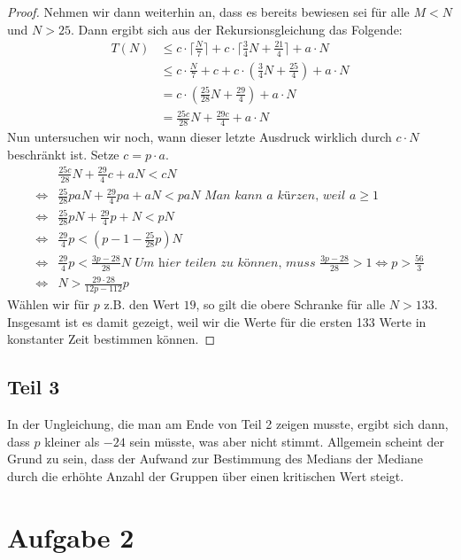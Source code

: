 \documentclass[10pt,a4paper]{article}
\begin{document}
\begin{proof}
  Nehmen wir dann weiterhin an, dass es bereits bewiesen sei für alle $M < N$ und $N > 25$.
  Dann ergibt sich aus der Rekursionsgleichung das Folgende:
  \begin{align*}
    T(N) & \le c \cdot \lceil \frac{N}{7} \rceil + c \cdot \lceil \frac{3}{4}N + \frac{21}{4} \rceil + a \cdot N\\
    & \le c \cdot \frac{N}{7} + c + c \cdot \left( \frac{3}{4}N + \frac{25}{4} \right) + a \cdot N\\
    & = c \cdot \left( \frac{25}{28}N + \frac{29}{4} \right) + a \cdot N\\
    & = \frac{25c}{28}N + \frac{29c}{4} + a \cdot N
  \end{align*}
  Nun untersuchen wir noch, wann dieser letzte Ausdruck wirklich durch $c \cdot N$ beschränkt ist.
  Setze $c = p \cdot a$.
  \begin{align*}
    & \frac{25c}{28}N + \frac{29}{4}c + aN < cN\\
    \Leftrightarrow & \frac{25}{28}paN + \frac{29}{4}pa + aN < paN \textit{ Man kann $a$ kürzen, weil $a \ge 1$}\\
    \Leftrightarrow & \frac{25}{28}pN + \frac{29}{4}p + N < pN\\
    \Leftrightarrow & \frac{29}{4}p < (p - 1 - \frac{25}{28}p)N\\
    \Leftrightarrow & \frac{29}{4}p < \frac{3p - 28}{28}N \textit{ Um hier teilen zu können, muss $\frac{3p - 28}{28} > 1 \Leftrightarrow p > \frac{56}{3}$}\\
    \Leftrightarrow & N > \frac{29 \cdot 28}{12p - 112}p
  \end{align*}
  Wählen wir für $p$ z.B. den Wert $19$, so gilt die obere Schranke für alle $N > 133$.
  Insgesamt ist es damit gezeigt, weil wir die Werte für die ersten 133 Werte in konstanter Zeit bestimmen können.
\end{proof}

\subsection{Teil 3}
In der Ungleichung, die man am Ende von Teil 2 zeigen musste, ergibt sich dann, dass $p$ kleiner als $-24$ sein müsste, was aber nicht stimmt.
Allgemein scheint der Grund zu sein, dass der Aufwand zur Bestimmung des Medians der Mediane durch die erhöhte Anzahl der Gruppen über einen kritischen Wert steigt.

\section{Aufgabe 2}
\end{document}
